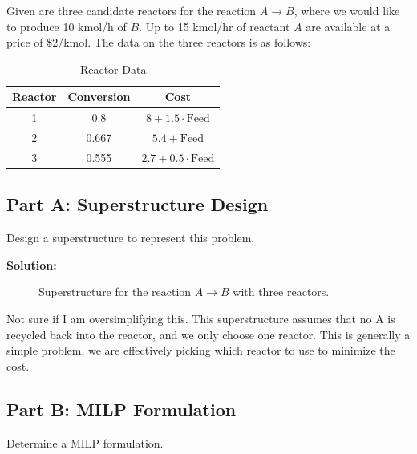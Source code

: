 \documentclass[11pt]{article}
\begin{document}
Given are three candidate reactors for the reaction \( A \rightarrow B \), where we would like to produce 10 kmol/h of \( B \). Up to 15 kmol/hr of reactant \( A \) are available at a price of \$2/kmol. The data on the three reactors is as follows:

\begin{table}[htbp]
\centering
\begin{tabular}{|c|c|c|}
\hline
\textbf{Reactor} & \textbf{Conversion} & \textbf{Cost} \\ \hline
1 & 0.8 & \( 8 + 1.5 \cdot \text{Feed} \) \\ \hline
2 & 0.667 & \( 5.4 + \text{Feed} \) \\ \hline
3 & 0.555 & \( 2.7 + 0.5 \cdot \text{Feed} \) \\ \hline
\end{tabular}
\caption{Reactor Data}
\label{tab:reactor_data}
\end{table}

\subsection{Part A: Superstructure Design}
Design a superstructure to represent this problem.

\textbf{Solution:}
\begin{figure}[htbp]
\centering
{}
\caption{Superstructure for the reaction \( A \rightarrow B \) with three reactors.}
\label{fig:superstructure_reactors}
\end{figure}
Not sure if I am oversimplifying this.
This superstructure assumes that no A is recycled back into the reactor, and we only choose one reactor.
This is generally a simple problem, we are effectively picking which reactor to use to minimize the cost.

\subsection{Part B: MILP Formulation}
Determine a MILP formulation.
\end{document}
